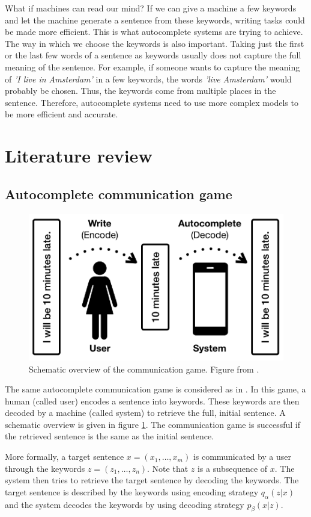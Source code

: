
What if machines can read our mind? 
If we can give a machine a few keywords and let the machine generate a sentence from these keywords, writing tasks could be made more efficient.
This is what autocomplete systems are trying to achieve. 
The way in which we choose the keywords is also important. 
Taking just the first or the last few words of a sentence as keywords usually does not capture the full meaning of the sentence.
For example, if someone wants to capture the meaning of \textit{'I live in Amsterdam'} in a few keywords, the words \textit{'live Amsterdam'} would probably be chosen. 
Thus, the keywords come from multiple places in the sentence. 
Therefore, autocomplete systems need to use more complex models to be more efficient and accurate. 

\section{Literature review}

\subsection{Autocomplete communication game}

\begin{figure}
    \centering
    \includegraphics[width=.5\linewidth]{figs/autocomplete_game.png}
    \caption{Schematic overview of the communication game. Figure from \protect{}.}
    \label{fig:autocomplete}
\end{figure}

The same autocomplete communication game is considered as in . In this game, a human (called user) encodes a sentence into keywords. 
These keywords are then decoded by a machine (called system) to retrieve the full, initial sentence. 
A schematic overview is given in figure \ref{fig:autocomplete}. 
The communication game is successful if the retrieved sentence is the same as the initial sentence. 

More formally, a target sentence $x=(x_1, \dots, x_m)$ is communicated by a user through the keywords $z=(z_1, \dots, z_n)$. 
Note that $z$ is a subsequence of $x$. 
The system then tries to retrieve the target sentence by decoding the keywords. 
The target sentence is described by the keywords using encoding strategy $q_{\alpha}(z | x)$ and the system decodes the keywords by using decoding strategy $p_{\beta}(x|z)$. 

